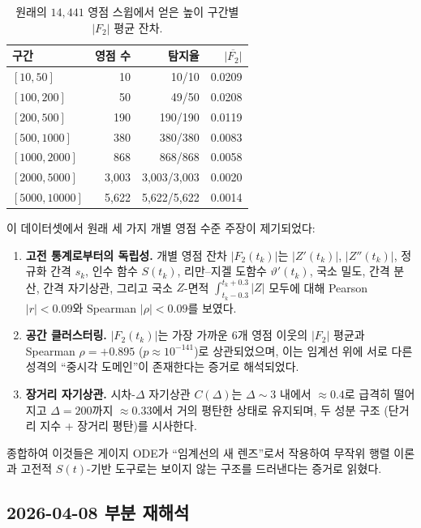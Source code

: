 \documentclass[11pt, a4paper]{article}
\theoremstyle{definition}
\theoremstyle{plain}
\begin{document}
\begin{table}[ht]
\centering
\caption{원래의 $14{,}441$ 영점 스윕에서 얻은 높이 구간별 $|F_2|$ 평균 잔차.}
\label{tab:f2_scale}
\small
\begin{tabular}{lrrr}
\toprule
\textbf{구간} & \textbf{영점 수} & \textbf{탐지율}
  & $\overline{|F_2|}$ \\
\midrule
$[10, 50]$       & 10     & 10/10     & 0.0209 \\
$[100, 200]$     & 50     & 49/50     & 0.0208 \\
$[200, 500]$     & 190    & 190/190   & 0.0119 \\
$[500, 1000]$    & 380    & 380/380   & 0.0083 \\
$[1000, 2000]$   & 868    & 868/868   & 0.0058 \\
$[2000, 5000]$   & 3{,}003  & 3{,}003/3{,}003 & 0.0020 \\
$[5000, 10000]$  & 5{,}622  & 5{,}622/5{,}622 & 0.0014 \\
\bottomrule
\end{tabular}
\end{table}

이 데이터셋에서 원래 세 가지 개별 영점 수준 주장이 제기되었다:
\begin{enumerate}
  \item[(O1)] \textbf{고전 통계로부터의 독립성.} 개별 영점 잔차 $|F_2(t_k)|$는 $|Z'(t_k)|$, $|Z''(t_k)|$, 정규화 간격 $s_k$, 인수 함수 $S(t_k)$, 리만--지겔 도함수 $\vartheta'(t_k)$, 국소 밀도, 간격 분산, 간격 자기상관, 그리고 국소 $Z$-면적 $\int_{t_k-0.3}^{t_k+0.3}|Z|$ 모두에 대해 Pearson $|r|<0.09$와 Spearman $|\rho|<0.09$를 보였다.
  \item[(O2)] \textbf{공간 클러스터링.} $|F_2(t_k)|$는 가장 가까운 6개 영점 이웃의 $|F_2|$ 평균과 Spearman $\rho=+0.895$ ($p\approx 10^{-141}$)로 상관되었으며, 이는 임계선 위에 서로 다른 성격의 ``중시각 도메인''이 존재한다는 증거로 해석되었다.
  \item[(O3)] \textbf{장거리 자기상관.} 시차-$\Delta$ 자기상관 $C(\Delta)$는 $\Delta\sim 3$ 내에서 $\approx 0.4$로 급격히 떨어지고 $\Delta=200$까지 $\approx 0.33$에서 거의 평탄한 상태로 유지되며, 두 성분 구조 (단거리 지수 + 장거리 평탄)를 시사한다.
\end{enumerate}

종합하여 이것들은 게이지 ODE가 ``임계선의 새 렌즈''로서 작용하여 무작위 행렬 이론과 고전적 $S(t)$-기반 도구로는 보이지 않는 구조를 드러낸다는 증거로 읽혔다.

\subsection{2026-04-08 부분 재해석}
\label{sec:f2_residual_reinterp}
\end{document}

